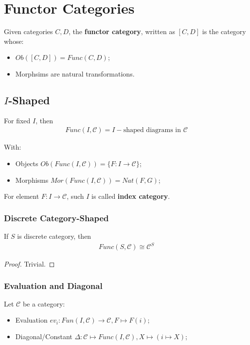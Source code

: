 \documentclass[Total.tex]{subfiles}
\begin{document}
		\section{Functor Categories}
			\begin{Def}
				Given categories $C,D$, the \textbf{functor category}, written as $[C,D]$ is the category whose:
				\begin{itemize}
					\item $Ob([C,D])=Func(C,D)$;
					\item Morphsims are natural transformations. 
				\end{itemize}
			\end{Def}
			
			\subsection{$I$-Shaped }
				\begin{Def}
					For fixed $I$, then 
					\begin{gather*}
						Func(I,\mathcal{C})=I-\mbox{shaped diagrams in }\mathcal{C}
					\end{gather*}
					
					With:
					\begin{itemize}
						\item Objects $Ob(Func(I,\mathcal{C}))=\{F:I\rightarrow \mathcal{C}\}$;
						\item Morphisms $Mor(Func(I,\mathcal{C}))=Nat(F,G)$;
					\end{itemize}
					
					For element $F:I\rightarrow \mathcal{C}$, such $I$ is called \textbf{index category}.
				\end{Def}
				
				\subsubsection{Discrete Category-Shaped}
				\begin{proposition}
					If $S$ is discrete category, then
					\begin{gather*}
						Func(S,\mathcal{C})\cong \mathcal{C}^S
					\end{gather*}
				\end{proposition}
				\begin{proof}
					Trivial. 
				\end{proof}
				
				\subsubsection{Evaluation and Diagonal}
				\begin{Def}
					Let $\mathcal{C}$ be a category:
					\begin{itemize}
						\item Evaluation $ev_i:Fun(I,\mathcal{C})\rightarrow \mathcal{C}, F\mapsto F(i)$;
						\item Diagonal/Constant $\Delta:\mathcal{C}\mapsto Func(I,\mathcal{C}),X\mapsto (i\mapsto X)$;
					\end{itemize}
				\end{Def}
				
\end{document}

